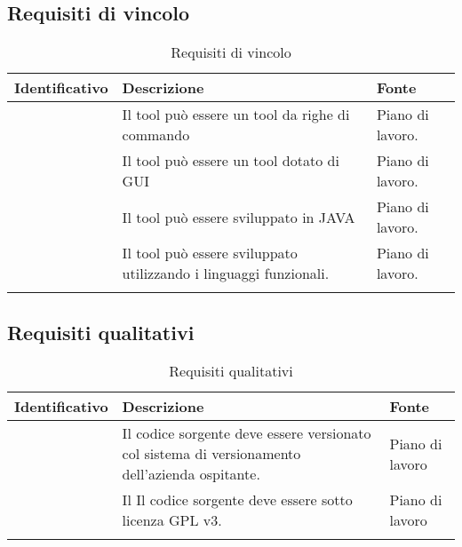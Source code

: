 \subsection{Requisiti di vincolo}\label{subsec:requisiti-vincolo}
\renewcommand{\arraystretch}{1.5}
\begin{center}
    \begin{longtable}{ | c| C{7cm} |C{3cm} |}
        \hline
        \textbf{Identificativo} & \textbf{Descrizione} &\textbf{Fonte}\\\hline
         &Il tool può essere un tool da righe di commando & Piano di lavoro.\\\hline
         &Il tool può essere un tool dotato di GUI & Piano di lavoro.\\\hline
         &Il tool può essere sviluppato in JAVA & Piano di lavoro.\\\hline
         &Il tool può essere sviluppato utilizzando i linguaggi funzionali.& Piano di lavoro.\\\hline
        \caption{Requisiti di vincolo}
    \end{longtable}
\end{center}
\setcounter{rowcount}{0}

\subsection{Requisiti qualitativi}\label{subsec:requisiti-qualitativi}
\renewcommand{\arraystretch}{1.5}
\begin{center}
    \begin{longtable}{ | c| C{7cm} |C{3cm} |}
        \hline
        \textbf{Identificativo} & \textbf{Descrizione} &\textbf{Fonte}\\\hline
        &Il codice sorgente deve essere versionato col sistema di versionamento dell'azienda ospitante. &Piano di lavoro \\\hline
        &Il Il codice sorgente deve essere sotto licenza GPL v3.& Piano di lavoro\\\hline
        \caption{Requisiti qualitativi}
    \end{longtable}
\end{center}
\setcounter{subCount}{0}
\setcounter{rowcount}{0}